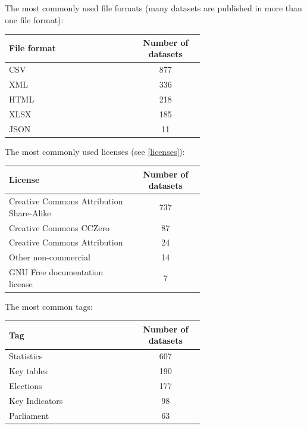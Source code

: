 \documentclass[thesis=B,english]{sprlajur-slovakopendata}[2018/05/12]
\begin{document}
\vspace{20px}
The most commonly used file formats (many datasets are published in more than one file format):
\begin{center}
	\begin{tabular}{  p{0.65\linewidth} | c }
		\textbf{File format} & \textbf{Number of datasets} \\ \hline
		CSV                  & 877                         \\
		XML                  & 336                         \\
		HTML                 & 218                         \\
		XLSX                 & 185                         \\
		JSON                 & 11                          \\
	\end{tabular}
\end{center}
\vspace{20px}
The most commonly used licenses (see \ref{licenses}):
\begin{center}
	\begin{tabular}{  p{0.65\linewidth} | c }
		\textbf{License}                         & \textbf{Number of datasets} \\ \hline
		Creative Commons Attribution Share-Alike & 737                         \\
		Creative Commons CCZero                  & 87                          \\
		Creative Commons Attribution             & 24                          \\
		Other non-commercial                     & 14                          \\
		GNU Free documentation license           & 7                           \\
	\end{tabular}
\end{center}
\vspace{20px}
The most common tags:
\begin{center}
	\begin{tabular}{  p{0.65\linewidth} | c }
		\textbf{Tag}   & \textbf{Number of datasets} \\ \hline
		Statistics     & 607                         \\
		Key tables     & 190                         \\
		Elections      & 177                         \\
		Key Indicators & 98                          \\
		Parliament     & 63                          \\
	\end{tabular}
\end{center}
\end{document}

